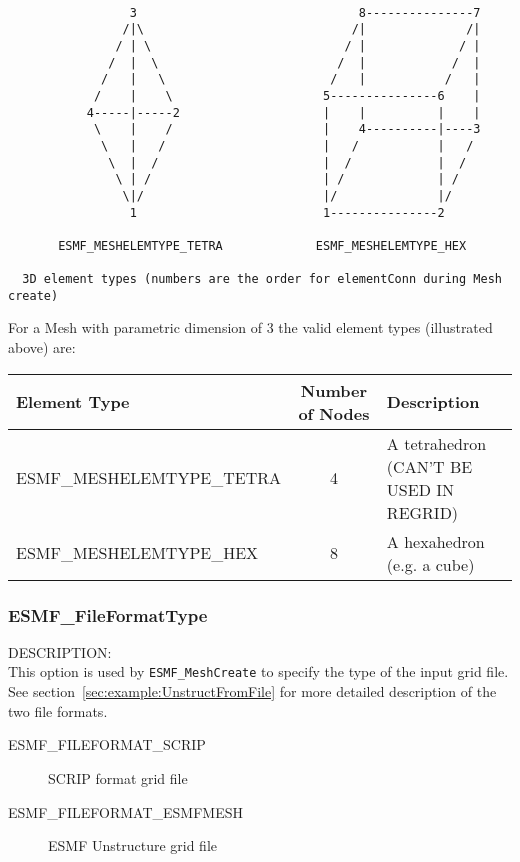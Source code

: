 \begin{verbatim}
                                            
                 3                               8---------------7
                /|\                             /|              /|
               / | \                           / |             / |
              /  |  \                         /  |            /  |
             /   |   \                       /   |           /   |
            /    |    \                     5---------------6    |
           4-----|-----2                    |    |          |    |
            \    |    /                     |    4----------|----3
             \   |   /                      |   /           |   /
              \  |  /                       |  /            |  /
               \ | /                        | /             | /
                \|/                         |/              |/
                 1                          1---------------2

       ESMF_MESHELEMTYPE_TETRA             ESMF_MESHELEMTYPE_HEX  

  3D element types (numbers are the order for elementConn during Mesh create)

\end{verbatim}

For a Mesh with parametric dimension of 3 the valid element types (illustrated above) are:

\smallskip

\begin{tabular}{|l|c|l|}
\hline
Element Type & Number of Nodes & Description \\
\hline
ESMF\_MESHELEMTYPE\_TETRA & 4 & A tetrahedron (CAN'T BE USED IN REGRID) \\
ESMF\_MESHELEMTYPE\_HEX  & 8 & A hexahedron (e.g. a cube) \\
\hline
\end{tabular}

\subsubsection{ESMF\_FileFormatType}
\label{sec:opt:fileformat}
{\sf DESCRIPTION:\\}
This option is used by {\tt ESMF_MeshCreate} to specify the type of the input grid file.  See 
section~\ref{sec:example:UnstructFromFile} for more detailed description of the two file formats.

\medskip
\begin{description}
\item [ESMF\_FILEFORMAT\_SCRIP] SCRIP format grid file

\item [ESMF\_FILEFORMAT\_ESMFMESH] ESMF Unstructure grid file
\end{description}


